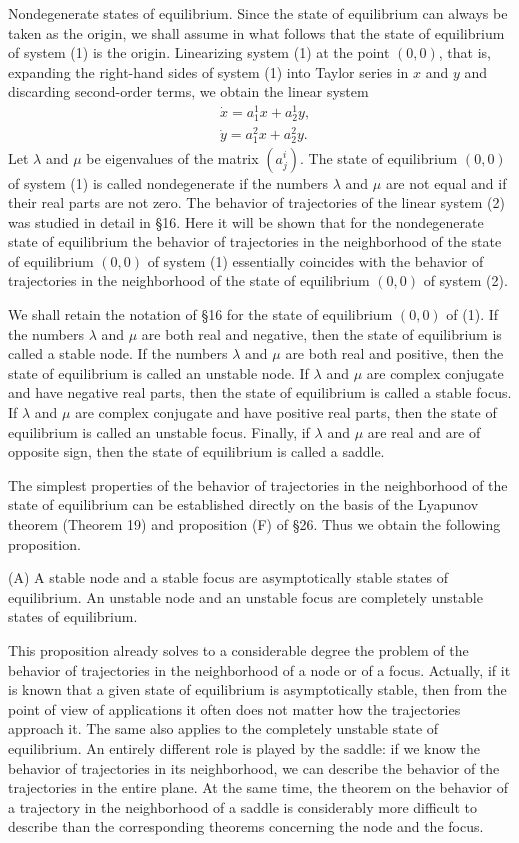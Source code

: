 \documentclass[10pt,a5paper]{book}
\theoremstyle{plain}
\theoremstyle{definition}
\theoremstyle{remark}
\begin{document}
Nondegenerate states of equilibrium. Since the state of equilibrium can always be taken as the origin, we shall assume in what follows that the state of equilibrium of system (1) is the origin. Linearizing system (1) at the point $(0,0)$, that is, expanding the right-hand sides of system (1) into Taylor series in $x$ and $y$ and discarding second-order terms, we obtain the linear system
\begin{align*}
& \dot{x}=a_{1}^{1} x+a_{2}^{1} y, \\
& \dot{y}=a_{1}^{2} x+a_{2}^{2} y . \tag{2}
\end{align*}
Let $\lambda$ and $\mu$ be eigenvalues of the matrix $\left(a_{j}^{i}\right)$. The state of equilibrium $(0,0)$ of system (1) is called nondegenerate if the numbers $\lambda$ and $\mu$ are not equal and if their real parts are not zero. The behavior of trajectories of the linear system (2) was studied in detail in §16. Here it will be shown that for the nondegenerate state of equilibrium the behavior of trajectories in the neighborhood of the state of equilibrium $(0,0)$ of system (1) essentially coincides with the behavior of trajectories in the neighborhood of the state of equilibrium $(0,0)$ of system (2).

We shall retain the notation of §16 for the state of equilibrium $(0,0)$ of (1). If the numbers $\lambda$ and $\mu$ are both real and negative, then the state of equilibrium is called a stable node. If the numbers $\lambda$ and $\mu$ are both real and positive, then the state of equilibrium is called an unstable node. If $\lambda$ and $\mu$ are complex conjugate and have negative real parts, then the state of equilibrium is called a stable focus. If $\lambda$ and $\mu$ are complex conjugate and have positive real parts, then the state of equilibrium is called an unstable focus. Finally, if $\lambda$ and $\mu$ are real and are of opposite sign, then the state of equilibrium is called a saddle.

The simplest properties of the behavior of trajectories in the neighborhood of the state of equilibrium can be established directly on the basis of the Lyapunov theorem (Theorem 19) and proposition (F) of §26. Thus we obtain the following proposition.

(A) A stable node and a stable focus are asymptotically stable states of equilibrium. An unstable node and an unstable focus are completely unstable states of equilibrium.

This proposition already solves to a considerable degree the problem of the behavior of trajectories in the neighborhood of a node or of a focus. Actually, if it is known that a given state of equilibrium is asymptotically stable, then from the point of view of applications it often does not matter how the trajectories approach it. The same also applies to the completely unstable state of equilibrium. An entirely different role is played by the saddle: if we know the behavior of trajectories in its neighborhood, we can describe the behavior of the trajectories in the entire plane. At the same time, the theorem on the behavior of a trajectory in the neighborhood of a saddle is considerably more difficult to describe than the corresponding theorems concerning the node and the focus.
\end{document}
